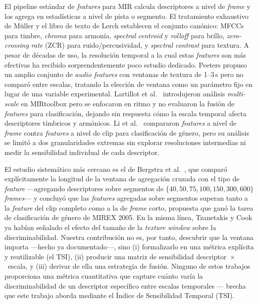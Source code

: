 \documentclass[conference]{IEEEtran}
\begin{document}
El pipeline estándar de \textit{features} para MIR calcula descriptores a nivel de \textit{frame} y los agrega en estadísticas a nivel de pista o segmento.
El tratamiento exhaustivo de M\"uller \cite{muller2015fundamentals} y el libro de texto de Lerch \cite{lerch2012introduction} establecen el conjunto 
canónico: MFCCs para timbre, \textit{chroma} para armonía, 
\textit{spectral centroid} y \textit{rolloff} para brillo, 
\textit{zero-crossing rate} (ZCR) para ruido/percusividad, y 
\textit{spectral contrast} para textura.
A pesar de décadas de uso, la resolución temporal a la cual estas \textit{features} son más efectivas ha recibido sorprendentemente poco estudio dedicado.
Peeters \cite{peeters2004large} propuso un amplio conjunto de 
\textit{audio features} con ventanas de textura de 1--3\,s pero no comparó entre escalas, tratando la elección de ventana como un parámetro fijo en lugar de una variable experimental.
Lartillot et al.\ \cite{lartillot2008multi} introdujeron análisis \textit{multi-scale} en MIRtoolbox pero se enfocaron en ritmo y no evaluaron la fusión de \textit{features} para clasificación, dejando sin respuesta cómo la escala temporal afecta descriptores tímbricos y armónicos.
Li et al.\ \cite{li2003comparative} compararon 
\textit{features} a nivel de \textit{frame} contra \textit{features} a nivel de clip para clasificación de género, pero su análisis se limitó a dos granularidades extremas sin explorar resoluciones intermedias ni medir la sensibilidad individual de cada descriptor.

El estudio sistemático más cercano es el de Bergstra et al.\ \cite{bergstra2006aggregate}, que comparó explícitamente la longitud de la ventana de agregación cruzada con el tipo de \textit{feature} ---agregando descriptores sobre segmentos de $\{40, 50, 75, 100, 150, 300, 600\}$ \textit{frames}--- y concluyó que las \textit{features} agregadas sobre segmentos superan tanto a la \textit{feature} del clip completo como a la de \textit{frame} corto, propuesta que ganó la tarea de clasificación de género de MIREX 2005. En la misma línea, Tzanetakis y Cook \cite{tzanetakis2002musical} ya habían señalado el efecto del tamaño de la \textit{texture window} sobre la discriminabilidad. Nuestra contribución no es, por tanto, descubrir que la ventana importa ---hecho ya documentado---, sino (i) formalizarlo en una métrica explícita y reutilizable (el TSI), (ii) producir una matriz de sensibilidad descriptor~$\times$~escala, y (iii) derivar de ella una estrategia de fusión.
Ninguno de estos trabajos proporciona una métrica cuantitativa que capture cuánto varía la discriminabilidad de un descriptor específico entre escalas temporales --- brecha que este trabajo aborda mediante el Índice de Sensibilidad Temporal (TSI).
\end{document}

